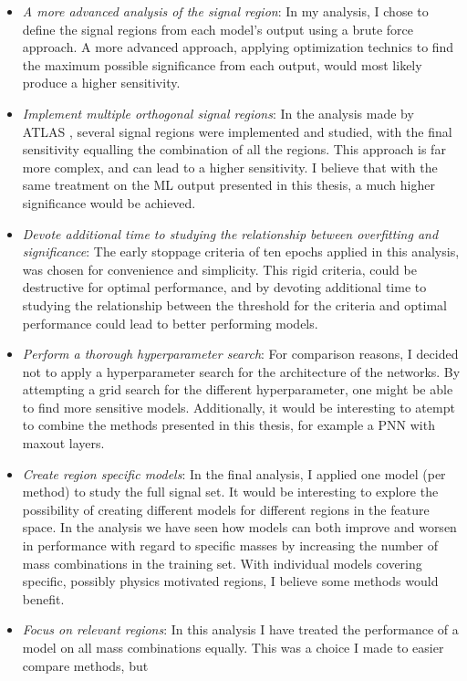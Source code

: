 \begin{itemize}
    \item \emph{A more advanced analysis of the signal region}: In my analysis, I chose to define the signal regions from each model's output using a brute force approach. 
          A more advanced approach, applying optimization technics to find the maximum possible significance from each output, would most likely produce a higher sensitivity.
    \item \emph{Implement multiple orthogonal signal regions}: In the analysis made by \ac{ATLAS} \cite{atlas_search_2021}, several signal regions were implemented and studied,
           with the final sensitivity equalling the combination of all the regions. This approach is far more complex, and can lead to a higher sensitivity. I believe that with the same 
           treatment on the \ac{ML} output presented in this thesis, a much higher significance would be achieved. 
    \item \emph{Devote additional time to studying the relationship between overfitting and significance}: The early stoppage criteria of ten epochs applied in this analysis, was chosen 
          for convenience and simplicity. This rigid criteria, could be destructive for optimal performance, and by devoting additional time to studying
          the relationship between the threshold for the criteria and optimal performance could lead to better performing models.
    \item \emph{Perform a thorough hyperparameter search}: For comparison reasons, I decided not to apply a hyperparameter search for the architecture of the networks. By attempting 
           a grid search for the different hyperparameter, one might be able to find more sensitive models. Additionally, it would be interesting to atempt to combine the methods presented 
           in this thesis, for example a \ac{PNN} with maxout layers. 
    \item \emph{Create region specific models}: In the final analysis, I applied one model (per method) to study the full signal set. It would be interesting to explore the possibility of creating
          different models for different regions in the feature space. In the analysis we have seen how models can both improve and worsen in performance with regard to specific masses by increasing
          the number of mass combinations in the training set. With individual models covering specific, possibly physics motivated regions, I believe some methods would benefit.
    \item \emph{Focus on relevant regions}: In this analysis I have treated the performance of a model on all mass combinations equally. This was a choice I made to easier compare methods, but 

\end{itemize}
